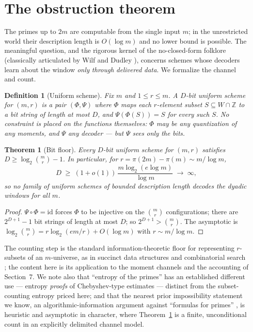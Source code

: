 \documentclass[11pt]{article}
\newtheorem{theorem}{Theorem}
\newtheorem{definition}{Definition}
\theoremstyle{remark}
\begin{document}
\section{The obstruction theorem}

The primes up to $2m$ are computable from the single input $m$; in the unrestricted world their
description length is $O(\log m)$ and no lower bound is possible. The meaningful question, and the
rigorous kernel of the no-closed-form folklore (classically articulated by Wilf and Dudley
\cite{Wilf,Dudley}), concerns schemes whose decoders learn about the window
\emph{only through delivered data}. We formalize the channel and count.

\begin{definition}[Uniform scheme]\label{def:scheme}
Fix $m$ and $1 \le r \le m$. A \emph{$D$-bit uniform scheme} for $(m, r)$ is a pair $(\Phi, \Psi)$
where $\Phi$ maps each $r$-element subset $S \subseteq W \cap \mathbb{Z}$ to a bit string of length at
most $D$, and $\Psi(\Phi(S)) = S$ for every such $S$. No constraint is placed on the functions
themselves: $\Phi$ may be any quantization of any moments, and $\Psi$ any decoder --- but $\Psi$ sees
only the bits.
\end{definition}

\begin{theorem}[Bit floor]\label{thm:lb}
Every $D$-bit uniform scheme for $(m, r)$ satisfies $D \ge \log_2 \binom{m}{r} - 1$. In particular,
for $r = \pi(2m) - \pi(m) \sim m/\log m$,
\[
D \;\ge\; (1 + o(1))\, \frac{m \log_2(e \log m)}{\log m} \;\longrightarrow\; \infty ,
\]
so no family of uniform schemes of bounded description length decodes the dyadic windows for all $m$.
\end{theorem}

\begin{proof}
$\Psi \circ \Phi = \mathrm{id}$ forces $\Phi$ to be injective on the $\binom{m}{r}$ configurations;
there are $2^{D+1} - 1$ bit strings of length at most $D$; so $2^{D+1} > \binom{m}{r}$. The
asymptotic is $\log_2\binom{m}{r} = r \log_2(em/r) + O(\log m)$ with $r \sim m/\log m$.
\end{proof}

The counting step is the standard information-theoretic floor for representing $r$-subsets of an
$m$-universe, as in succinct data structures \cite{BrodnikMunro} and combinatorial search
\cite{ErdosRenyi}; the content here is its application to the moment channels and the accounting of
Section~7. We note also that ``entropy of the primes'' has an established different use ---
entropy \emph{proofs} of Chebyshev-type estimates \cite{Kontoyiannis} --- distinct from the
subset-counting entropy priced here; and that the nearest prior impossibility statement we know, an
algorithmic-information argument against ``formulas for primes'' \cite{KolpakovRocke}, is heuristic
and asymptotic in character, where Theorem~\ref{thm:lb} is a finite, unconditional count in an
explicitly delimited channel model.
\end{document}
